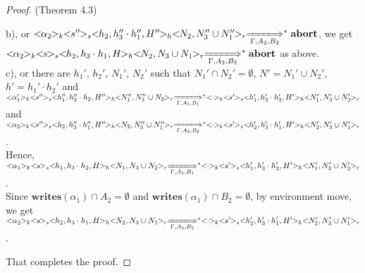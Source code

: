 \documentclass{lmcs} %
\theoremstyle{plain}\newtheorem{satz}[thm]{Satz} %
\begin{document}
\begin{proof}{(Theorem 4.3)}
\begin{itemize}
\begin{enumerate}
          b), or $<\!\!\alpha_2\!\!>_k<\!\!s''\!\!>_s<\!\!h_2,h_3''\cdot h_1'',H''\!\!>_h<\!\!N_2,N_3''\cup N_1''\!\!>_r\xLongrightarrow[\Gamma, A_2, B_2]{}^*\mathbf{abort}$. we get $<\!\!\alpha_2\!\!>_k<\!\!s\!\!>_s<\!\!h_2,h_3\cdot h_1,H\!\!>_h<\!\!N_2,N_3\cup N_1\!\!>_r\xLongrightarrow[\Gamma, A_2, B_2]{}^*\mathbf{abort}$ as above.\\
          c), or there are $h_1'$, $h_2'$, $N_1'$, $N_2'$ such that $N_1'\cap N_2'=\emptyset$, $N'=N_1'\cup N_2'$, $h'=h_1'\cdot h_2'$ and
      $<\!\!\alpha_1'\!\!>_k<\!\!s''\!\!>_s<\!\!h_1'',h_3''\cdot h_2,H''\!\!>_h<\!\!N_1'',N_3''\cup N_2\!\!>_r\xLongrightarrow[\Gamma, A_1, B_1]{}^*<\!\!\cdot\!\!>_k<\!\!s'\!\!>_s<\!\!h_1',h_3'\cdot h_2',H'\!\!>_h<\!\!N_1',N_3'\cup N_2'\!\!>_r$ and $<\!\!\alpha_2\!\!>_k<\!\!s''\!\!>_s<\!\!h_2,h_3''\cdot h_1'',H''\!\!>_h<\!\!N_2,N_3''\cup N_1''\!\!>_r\xLongrightarrow[\Gamma, A_2, B_2]{}^*<\!\!\cdot\!\!>_k<\!\!s'\!\!>_s<\!\!h_2',h_3'\cdot h_1',H'\!\!>_h<\!\!N_2',N_3'\cup N_1'\!\!>_r$.\\
      Hence, $<\!\!\alpha_1\!\!>_k<\!\!s\!\!>_s<\!\!h_1,h_3\cdot h_2,H\!\!>_h<\!\!N_1,N_3\cup N_2\!\!>_r\xLongrightarrow[\Gamma, A_1, B_1]{}^*<\!\!\cdot\!\!>_k<\!\!s'\!\!>_s<\!\!h_1',h_3'\cdot h_2',H'\!\!>_h<\!\!N_1',N_3'\cup N_2'\!\!>_r$.\\
      Since $\mathbf{writes}(\alpha_1)\cap A_2 =\emptyset$ and $\mathbf{writes}(\alpha_1)\cap B_2 =\emptyset$, by environment move, we get $<\!\!\alpha_2\!\!>_k<\!\!s\!\!>_s<\!\!h_2,h_3\cdot h_1,H\!\!>_h<\!\!N_2,N_3\cup N_1\!\!>_r\xLongrightarrow[\Gamma, A_2, B_2]{}^*<\!\!\cdot\!\!>_k<\!\!s'\!\!>_s<\!\!h_2',h_3'\cdot h_1',H'\!\!>_h<\!\!N_2',N_3'\cup N_1'\!\!>_r$.
    \end{enumerate}
\end{itemize}
That completes the proof.
\end{proof}
\end{document}
